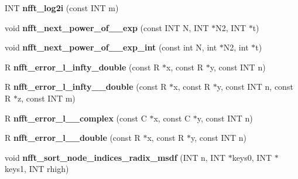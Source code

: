 \begin{DoxyCompactItemize}
\item 
\hypertarget{group__nfftutil_ga0d10b4e7f62f2f59a3dd1c6572f7c745}{I\-N\-T {\bfseries nfft\-\_\-log2i} (const I\-N\-T m)}\label{group__nfftutil_ga0d10b4e7f62f2f59a3dd1c6572f7c745}

\item 
\hypertarget{group__nfftutil_ga10f55db3a6476cdfa1c36ff07fc1568f}{void {\bfseries nfft\-\_\-next\-\_\-power\-\_\-of\-\_\-\_\-exp} (const I\-N\-T N, I\-N\-T $\ast$N2, I\-N\-T $\ast$t)}\label{group__nfftutil_ga10f55db3a6476cdfa1c36ff07fc1568f}

\item 
\hypertarget{group__nfftutil_gabfd6cf111d6285d0bd12b4dd648a4bc8}{void {\bfseries nfft\-\_\-next\-\_\-power\-\_\-of\-\_\-\_\-exp\-\_\-int} (const int N, int $\ast$N2, int $\ast$t)}\label{group__nfftutil_gabfd6cf111d6285d0bd12b4dd648a4bc8}

\item 
\hypertarget{group__nfftutil_ga260526a350cdcd654dd0c1d4ee4b118f}{R {\bfseries nfft\-\_\-error\-\_\-l\-\_\-infty\-\_\-double} (const R $\ast$x, const R $\ast$y, const I\-N\-T n)}\label{group__nfftutil_ga260526a350cdcd654dd0c1d4ee4b118f}

\item 
\hypertarget{group__nfftutil_ga091f85ebad9ae1209ac8461be9e6df05}{R {\bfseries nfft\-\_\-error\-\_\-l\-\_\-infty\-\_\-\_\-double} (const R $\ast$x, const R $\ast$y, const I\-N\-T n, const R $\ast$z, const I\-N\-T m)}\label{group__nfftutil_ga091f85ebad9ae1209ac8461be9e6df05}

\item 
\hypertarget{group__nfftutil_gaf0f39ca69fab6b689e55b5d203318472}{R {\bfseries nfft\-\_\-error\-\_\-l\-\_\-\_\-complex} (const C $\ast$x, const C $\ast$y, const I\-N\-T n)}\label{group__nfftutil_gaf0f39ca69fab6b689e55b5d203318472}

\item 
\hypertarget{group__nfftutil_ga887b020a765b537139a758a0b7a69323}{R {\bfseries nfft\-\_\-error\-\_\-l\-\_\-\_\-double} (const R $\ast$x, const R $\ast$y, const I\-N\-T n)}\label{group__nfftutil_ga887b020a765b537139a758a0b7a69323}

\item 
\hypertarget{group__nfftutil_gab83a1d69a2627b717f2847ef95dbd18c}{void {\bfseries nfft\-\_\-sort\-\_\-node\-\_\-indices\-\_\-radix\-\_\-msdf} (I\-N\-T n, I\-N\-T $\ast$keys0, I\-N\-T $\ast$keys1, I\-N\-T rhigh)}\label{group__nfftutil_gab83a1d69a2627b717f2847ef95dbd18c}


\end{DoxyCompactItemize}
